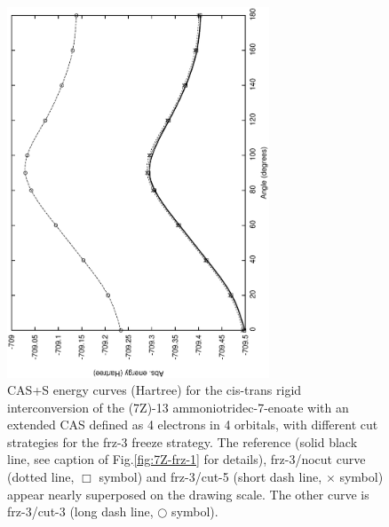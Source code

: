 \begin{figure}[h!]
\begin{center}
\includegraphics[width=78mm,angle=270]{02_localization/images/7Z-frz-3-cas44.eps}
\caption{\footnotesize CAS+S energy curves (Hartree) for the cis-trans rigid
interconversion of the (7Z)-13 ammoniotridec-7-enoate with an extended CAS
defined as 4 electrons in 4 orbitals, with different cut strategies for the
frz-3 freeze strategy. The reference (solid black line, see caption of
Fig.\ref{fig:7Z-frz-1} for details), frz-3/nocut curve (dotted line,
$\Box$ symbol) and frz-3/cut-5 (short dash line, $\times$ symbol) appear
nearly superposed on the drawing scale. The other curve is frz-3/cut-3 (long
dash line, $\bigcirc$ symbol).
}
\label{fig:7Z-frz-3-cas44}
\end{center}
\end{figure}

